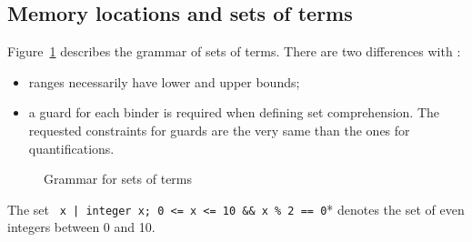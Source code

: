 \nodiff


\subsection{Memory locations and sets of terms}
\label{sec:locations}


Figure~\ref{fig:gram:locations} describes the grammar of sets of terms. There
are two differences with \acsl:
\begin{itemize}
\item ranges necessarily have lower and upper bounds;
\item a guard for each binder is required when defining set comprehension. The
  requested constraints for guards are the very same than the ones for
  quantifications.
\end{itemize}

\begin{figure}[htbp]
  \caption{Grammar for sets of terms}
\label{fig:gram:locations}
\end{figure}

\begin{notimplementedenv}
\begin{example}\label{ex:tset}
The set \lstinline*{ x | integer x; 0 <= x <= 10 && x % 2 == 0}* denotes the
set of even integers between 0 and 10.
\end{example}
\end{notimplementedenv}



